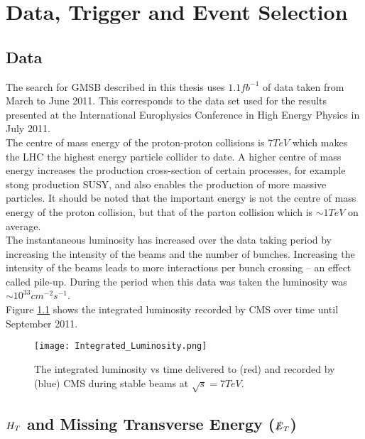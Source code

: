 \chapter{Data, Trigger and Event Selection}

\section{Data}

The search for GMSB described in this thesis uses $1.1 \unit{fb^{-1}}$ of data 
taken from March to June 2011. This corresponds to the data set used for the 
results presented at the International Europhysics Conference in High Energy 
Physics in July 2011. \\

The centre of mass energy of the proton-proton collisions is $7\unit{TeV}$ which
makes the LHC the highest energy particle collider to date. A higher centre of 
mass energy increases the production cross-section of certain processes, for 
example stong production SUSY, and also enables the production of more massive 
particles. It should be noted that the important energy is not the centre of 
mass energy of the proton collision, but that of the parton collision which is 
$\sim 1 \unit{TeV}$ on average. \\

The instantaneous luminosity has increased over the data taking period by 
increasing the intensity of the beams and the number of bunches. Increasing the 
intensity of the beams leads to more interactions per bunch crossing -- an 
effect called pile-up. During the period when this data was taken the luminosity 
was $\sim 10^{33} \unit{cm^{-2}s^{-1}}$. \\

Figure \ref{fig:intlumi} shows the integrated luminosity recorded by CMS over 
time until September 2011. \\

\begin{figure}
\begin{center}
\texttt{[image: Integrated\_Luminosity.png]}
\caption{The integrated luminosity vs time delivered to (red) and recorded by
(blue) CMS during stable beams at $\sqrt{s} = 7 \unit{TeV}$.}
\end{center}
\label{fig:intlumi}
\end{figure}

\section{$H_{T}$ and Missing Transverse Energy ($\slashed{E}_{T}$)}

